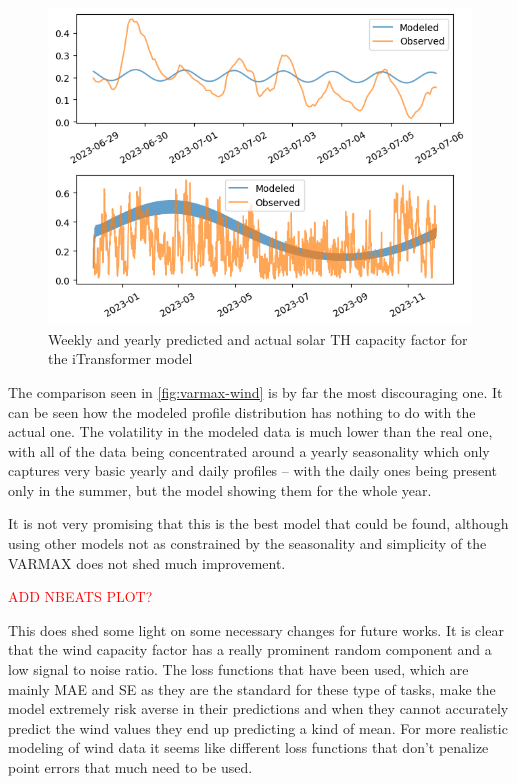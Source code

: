 \begin{figure}[ht]
    \centering
    \captionsetup{justification=centering}
    \includegraphics[width=0.7\linewidth]{assets/varmax-wind.png}
    \caption{Weekly and yearly predicted and actual solar TH capacity factor for the iTransformer model}
    \label{fig:varmax-wind}
\end{figure}
The comparison seen in \autoref{fig:varmax-wind} is by far the most discouraging one. It can be seen how the modeled profile distribution has nothing to do with the actual one. The volatility in the modeled data is much lower than the real one, with all of the data being concentrated around a yearly seasonality which only captures very basic yearly and daily profiles -- with the daily ones being present only in the summer, but the model showing them for the whole year. 

It is not very promising that this is the best model that could be found, although using other models not as constrained by the seasonality and simplicity of the VARMAX does not shed much improvement. 

\textcolor{red}{ADD NBEATS PLOT?}

This does shed some light on some necessary changes for future works. It is clear that the wind capacity factor has a really prominent random component and a low signal to noise ratio. The loss functions that have been used, which are mainly MAE and SE as they are the standard for these type of tasks, make the model extremely risk averse in their predictions and when they cannot accurately predict the wind values they end up predicting a kind of mean. For more realistic modeling of wind data it seems like different loss functions that don't penalize point errors that much need to be used. 


